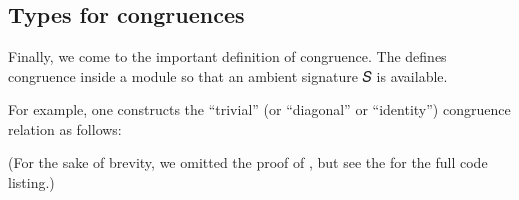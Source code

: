 \documentclass[a4paper,UKenglish,cleveref, autoref, thm-restate]{lipics-v2019}
\begin{document}
\begin{code}\>[0]\AgdaSpace{}%
\AgdaSymbol{:}%
\>[806I]\AgdaSymbol{\{}\AgdaSpace{}%
\AgdaSymbol{:}\AgdaSpace{}%
\AgdaSpace{}%
\AgdaSpace{}%
\AgdaSymbol{\}}\AgdaSpace{}%
\AgdaSymbol{\{}\AgdaSpace{}%
\AgdaSymbol{:}\AgdaSpace{}%
\AgdaSpace{}%
\AgdaSpace{}%
\AgdaSymbol{\}}\<%
\\
\>[.][@{}l@{}]\<[806I]%
\>[17]\AgdaSymbol{(}\AgdaSpace{}%
\AgdaSymbol{:}\AgdaSpace{}%
\AgdaSymbol{(}\AgdaSpace{}%
\AgdaSpace{}%
\AgdaSymbol{)}\AgdaSpace{}%
\AgdaSpace{}%
\AgdaSymbol{)(}\AgdaSpace{}%
\AgdaSymbol{:}\AgdaSpace{}%
\AgdaSpace{}%
\AgdaSpace{}%
\AgdaSymbol{)}\<%
\\
\>[0][@{}l@{\AgdaIndent{0}}]%
\>[1]%
\>[17]\AgdaSpace{}%
\AgdaSpace{}%
\AgdaSpace{}%
\AgdaSpace{}%
\AgdaSpace{}%
\<%
\\
\>[0]\AgdaSpace{}%
\AgdaSpace{}%
%
\>[20]\AgdaSymbol{=}\AgdaSpace{}%
\AgdaSymbol{(}\AgdaSpace{}%
\AgdaSymbol{)}\AgdaSpace{}%
\AgdaOperator{\AgdaFunction{=[}}\AgdaSpace{}%
\AgdaSpace{}%
\AgdaOperator{\AgdaFunction{]⇒}}\AgdaSpace{}%
\<%
\end{code}

\subsection{Types for congruences}\label{types-for-congruences}
Finally, we come to the important definition of congruence. The \agdaualib defines congruence inside a module so that an ambient signature \ab 𝑆 is available.
\begin{code}\end{code}

For example, one constructs the ``trivial'' (or ``diagonal'' or ``identity'') congruence relation as follows:
\begin{code}\end{code}
(For the sake of brevity, we omitted the proof of , but see the \consmodule for the full code listing.)
\end{document}
